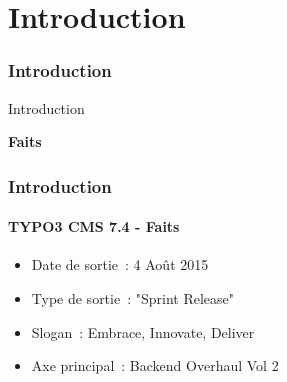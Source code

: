 %

\section{Introduction}
\begin{frame}[fragile]
	\frametitle{Introduction}

	\begin{center}\huge{Introduction}\end{center}
	\begin{center}\huge{\color{typo3darkgrey}\textbf{Faits}}\end{center}

\end{frame}

\begin{frame}[fragile]
	\frametitle{Introduction}
	\framesubtitle{TYPO3 CMS 7.4 - Faits}

	\begin{itemize}
		\item Date de sortie~: 4 Août 2015
		\item Type de sortie~: "Sprint Release"
		\item Slogan~: Embrace, Innovate, Deliver
		\item Axe principal~: Backend Overhaul Vol 2
	\end{itemize}

\end{frame}

